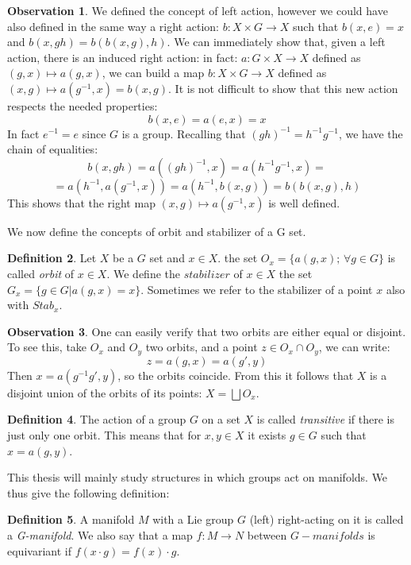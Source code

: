 \documentclass[12pt,a4paper]{report}
\theoremstyle{definition}
\newtheorem{Def}{Definition}[chapter]
\theoremstyle{Theorem}
\theoremstyle{definition}
\theoremstyle{definition}
\newtheorem{Obs}[Def]{Observation}
\begin{document}
	\begin{Obs}
		We defined the concept of left action, however we could have also defined in the same way a right action: $b:X\times G\rightarrow X$ such that $b(x,e)=x$ and $b(x,gh)=b(b(x,g),h)$. We can immediately show that, given a left action, there is an induced right action: in fact: $a:G\times X\rightarrow X$ defined as $(g,x)\longmapsto a(g,x)$, we can build a map $b:X\times G\rightarrow X$ defined as $(x,g)\longmapsto a(g^{-1},x)=b(x,g)$. 
		It is not difficult to show that this new action respects the needed properties:
		$$b(x,e)=a(e,x)=x$$
		In fact $e^{-1}=e$ since $G$ is a group. Recalling that $(gh)^{-1}=h^{-1}g^{-1}$, we have the chain of equalities:
		$$b(x,gh)=a((gh)^{-1},x)=a(h^{-1}g^{-1},x)=$$$$=a(h^{-1},a(g^{-1},x))=a(h^{-1},b(x,g))=b(b(x,g),h)$$
		This shows that the right map $(x,g)\longmapsto a(g^{-1},x)$ is well defined.
	\end{Obs}
	We now define the concepts of orbit and stabilizer of a G set.
	\begin{Def}
		Let $X$ be a $G$ set and $x\in X$. the set $O_x=\{a(g,x); \, \forall g\in G\}$ is called \textit{orbit} of $x\in X$. We define the $\textit{stabilizer}$ of $x\in X$ the set $G_x=\{g\in G|a(g,x)=x\}$. Sometimes we refer to the stabilizer of a point $x$ also with $Stab_x$.
	\end{Def}
	\begin{Obs} \label{Obs: 2.1}
		One can easily verify that two orbits are either equal or disjoint. To see this, take $O_x$ and $O_y$ two orbits, and a point $z\in O_x\cap O_y$, we can write:
		$$z=a(g,x)=a(g',y)$$
		Then $x=a(g^{-1}g',y)$, so the orbits coincide.
		From this it follows that $X$ is a disjoint union of the orbits of its points: $X=\bigsqcup O_x$.
	\end{Obs}
	\begin{Def}
		The action of a group $G$ on a set $X$ is called \textit{transitive} if there is just only one orbit. This means that for $x,y\in X$ it exists $g\in G$ such that $x=a(g,y)$.
	\end{Def}
	This thesis will mainly study structures in which groups act on manifolds. We thus give the following definition:
	\begin{Def}
		A manifold $M$ with a Lie group $G$ (left) right-acting on it is called a \textit{G-manifold}. We also say that a map $f:M\rightarrow N$ between $G-manifolds$ is equivariant if $f(x\cdot g)=f(x)\cdot g$.
	\end{Def}		
\end{document}
